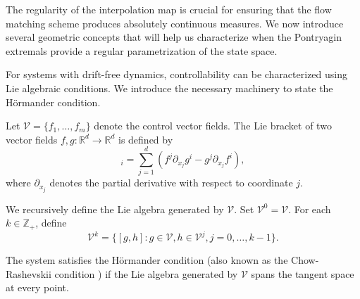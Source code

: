 \documentclass{article}
\begin{document}
The regularity of the interpolation map is crucial for ensuring that the flow matching scheme produces absolutely continuous measures. We now introduce several geometric concepts that will help us characterize when the Pontryagin extremals provide a regular parametrization of the state space.





For systems with drift-free dynamics, controllability can be characterized using Lie algebraic conditions. We introduce the necessary machinery to state the Hörmander condition.

Let $\mathcal{V} = \{f_1, \ldots, f_m\}$ denote the control vector fields. The Lie bracket of two vector fields $f, g: \mathbb{R}^d \rightarrow \mathbb{R}^d$ is defined by
\begin{equation}
[f,g]_i = \sum_{j=1}^d \left(f^j \partial_{x_j} g^i - g^j \partial_{x_j} f^i\right),
\end{equation}
where $\partial_{x_j}$ denotes the partial derivative with respect to coordinate $j$.

We recursively define the Lie algebra generated by $\mathcal{V}$. Set $\mathcal{V}^0 = \mathcal{V}$. For each $k \in \mathbb{Z}_+$, define
\[\mathcal{V}^k = \{[g, h] : g \in \mathcal{V}, h \in \mathcal{V}^{j}, j = 0, \ldots, k-1\}.\]

The system satisfies the Hörmander condition (also known as the Chow-Rashevskii condition \cite{agrachev2019comprehensive}) if the Lie algebra generated by $\mathcal{V}$ spans the tangent space at every point.
\end{document}
